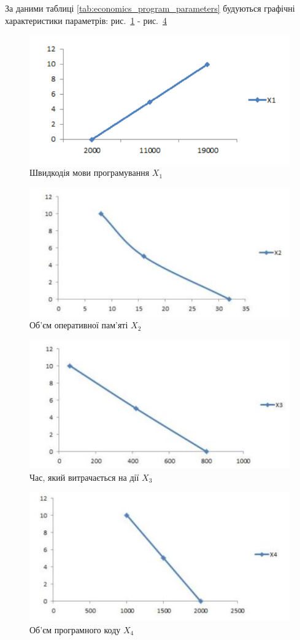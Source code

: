 За даними таблиці \ref{tab:economics_program_parameters} будуються графічні характеристики параметрів: рис.~\ref{fig:economics:x1} - рис.~\ref{fig:economics:x4} 

\begin{figure}
	\centering
	\includegraphics[width=0.7\linewidth]{economics/img/x1}
	\caption{Швидкодія мови програмування $X_1$}
	\label{fig:economics:x1}
\end{figure}
\begin{figure}
	\centering
	\includegraphics[width=0.7\linewidth]{economics/img/x2}
	\caption{Об'єм оперативної пам'яті $X_2$}
	\label{fig:economics:x2}
\end{figure}
\begin{figure}
	\centering
	\includegraphics[width=0.7\linewidth]{economics/img/x3}
	\caption{Час, який витрачається на дії $X_3$}
	\label{fig:economics:x3}
\end{figure}
\begin{figure}
	\centering
	\includegraphics[width=0.7\linewidth]{economics/img/x4}
	\caption{Об'єм програмного коду $X_4$}
	\label{fig:economics:x4}
\end{figure}

